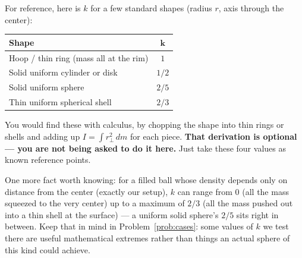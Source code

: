\documentclass[11pt]{article}
\begin{document}
\begin{psremark*}{}{}
For reference, here is $k$ for a few standard shapes (radius $r$, axis through the
center):
\begin{center}
\begin{tabular}{lc}
\textbf{Shape} & $\boldsymbol{k}$ \\
\hline
Hoop / thin ring (mass all at the rim) & $1$ \\
Solid uniform cylinder or disk & $1/2$ \\
Solid uniform sphere & $2/5$ \\
Thin uniform spherical shell & $2/3$ \\
\end{tabular}
\end{center}
You would find these with calculus, by chopping the shape into thin rings or shells and
adding up $I = \int r_\perp^2\, dm$ for each piece. \textbf{That derivation is optional
--- you are not being asked to do it here.} Just take these four values as known
reference points.

One more fact worth knowing: for a filled ball whose density depends only on distance
from the center (exactly our setup), $k$ can range from $0$ (all the mass squeezed to
the very center) up to a maximum of $2/3$ (all the mass pushed out into a thin shell at
the surface) --- a uniform solid sphere's $2/5$ sits right in between. Keep that in mind
in Problem~\ref{prob:cases}: some values of $k$ we test there are useful mathematical
extremes rather than things an actual sphere of this kind could achieve.
\end{psremark*}

\begin{center}
\end{center}
\end{document}
